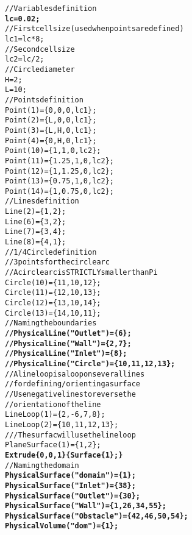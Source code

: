 \begin{alltt}
// Variables definition
{\bf{lc = 0.02;}}
// First cell size (used when points are defined)
lc1 = lc * 8;
// Second cell size
lc2 = lc / 2;
// Circle diameter
H=2;
L=10;
// Points definition 
Point(1)=\{0,0,0,lc1\};
Point(2) = \{L,0,0,lc1\};
Point(3) = \{L,H,0,lc1\};
Point(4) = \{0,H,0,lc1\};
Point(10)= \{1,1,0,lc2\};
Point(11)=\{1.25,1,0,lc2\}; 
Point(12)=\{1,1.25,0,lc2\}; 
Point(13)=\{0.75,1,0,lc2\}; 
Point(14)=\{1,0.75,0,lc2\};
// Lines definition
Line(2) = \{1,2\};
Line(6) = \{3,2\};
Line(7) = \{3,4\};
Line(8) = \{4,1\};
// 1/4 Circle definition
// 3 points for the circle arc
// A circle arc is STRICTLY smaller than Pi
Circle(10)=\{11,10,12\}; 
Circle(11)=\{12,10,13\}; 
Circle(12)=\{13,10,14\}; 
Circle(13)=\{14,10,11\};
// Naming the boundaries
{\bf{//Physical Line("Outlet") = \{6\};}}
{\bf{//Physical Line("Wall") = \{2,7\};}}
{\bf{//Physical Line("Inlet") = \{8\};}}
{\bf{//Physical Line("Circle") = \{10,11,12,13\};}}
// A lineloop is a loop on several lines
// for defining/orienting a surface
// Use negative lines to reverse the
// orientation of the line
Line Loop(1) = \{2,-6,7,8\};
Line Loop(2) = \{10,11,12,13\};
/// The surfac will use the lineloop
Plane Surface(1) = \{1,2\};
{\bf{Extrude \{0,0,1\} \{ Surface\{1\} ; \}}}
// Naming the domain
{\bf{Physical Surface("domain") = \{1\};}}
{\bf{Physical Surface("Inlet") = \{38\};}}
{\bf{Physical Surface("Outlet") = \{30\};}}
{\bf{Physical Surface("Wall") = \{1,26,34,55\};}}
{\bf{Physical Surface("Obstacle") = \{42,46,50,54\};}}
{\bf{Physical Volume("dom") = \{1\};}}
\end{alltt}
